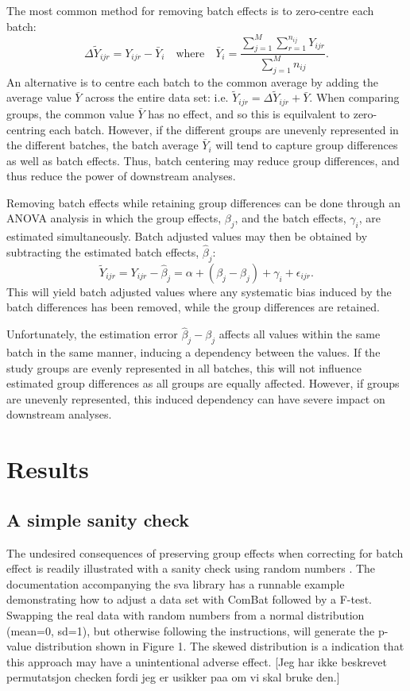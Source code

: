 \documentclass{bio}
\newcommand\NOTE[1]{{\color{red}[#1]}}
\begin{document}
The most common method for removing batch effects is to zero-centre each batch:
\begin{equation}
\Delta\widetilde Y_{ijr}=Y_{ijr}-\bar{Y}_{i}
\quad\text{where}\quad
\bar{Y}_i=\frac{\sum_{j=1}^M\sum_{r=1}^{n_{ij}} Y_{ijr}}{\sum_{j=1}^M n_{ij}}.
\end{equation}
An alternative is to centre each batch to the common average by adding the average value $\bar{Y}$ across the entire data set: i.e. $\widetilde Y_{ijr}=\Delta\widetilde Y_{ijr}+\bar{Y}$. When comparing groups, the common value $\bar{Y}$ has no effect, and so this is equilvalent to zero-centring each batch. However, if the different groups are unevenly represented in the different batches, the batch average $\bar{Y}_i$ will tend to capture group differences as well as batch effects. Thus, batch centering may reduce group differences, and thus reduce the power of downstream analyses.

Removing batch effects while retaining group differences can be done through an ANOVA analysis in which the group effects, $\beta_j$, and the batch effects, $\gamma_i$, are estimated simultaneously. Batch adjusted values may then be obtained by subtracting the estimated batch effects, $\hat\beta_j$:
\begin{equation}
\widetilde Y_{ijr}=Y_{ijr}-\hat\beta_j=\alpha+(\beta_j-\hat\beta_j)+\gamma_i+\epsilon_{ijr}.
\end{equation}
This will yield batch adjusted values where any systematic bias induced by the batch differences has been removed, while the group differences are retained.

Unfortunately, the estimation error $\hat\beta_j-\beta_j$ affects all values within the same batch in the same manner, inducing a dependency between the values. If the study groups are evenly represented in all batches, this will not influence estimated group differences as all groups are equally affected. However, if groups are unevenly represented, this induced dependency can have severe impact on downstream analyses.


\section{Results}

\subsection{A simple sanity check}

The undesired consequences of preserving group effects when correcting for batch effect is readily illustrated with a sanity check using random numbers . The documentation accompanying the sva library has a runnable example demonstrating how to adjust a data set with ComBat followed by a F-test. Swapping the real data with random numbers from a normal distribution (mean=0, sd=1), but otherwise following the instructions, will generate the p-value distribution shown in Figure 1. The skewed distribution is a indication that this approach may have a unintentional adverse effect. \NOTE{Jeg har ikke beskrevet permutatsjon checken fordi jeg er usikker paa om vi skal bruke den.}
\end{document}
